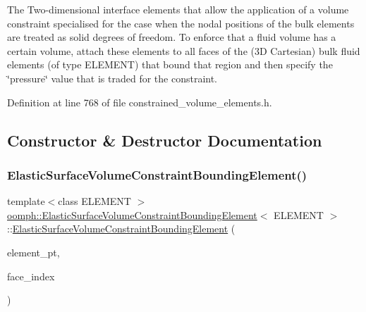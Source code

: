 The Two-\/dimensional interface elements that allow the application of a volume constraint specialised for the case when the nodal positions of the bulk elements are treated as solid degrees of freedom. To enforce that a fluid volume has a certain volume, attach these elements to all faces of the (3D Cartesian) bulk fluid elements (of type E\+L\+E\+M\+E\+NT) that bound that region and then specify the \char`\"{}pressure\char`\"{} value that is traded for the constraint. 

Definition at line 768 of file constrained\+\_\+volume\+\_\+elements.\+h.



\subsection{Constructor \& Destructor Documentation}
\mbox{\label{classoomph_1_1ElasticSurfaceVolumeConstraintBoundingElement_a22e5cb7f3cb0d363301ae8ef232dd6cb}} 
\subsubsection{\texorpdfstring{Elastic\+Surface\+Volume\+Constraint\+Bounding\+Element()}{ElasticSurfaceVolumeConstraintBoundingElement()}}
{\footnotesize\ttfamily template$<$class E\+L\+E\+M\+E\+NT $>$ \\
\hyperlink{classoomph_1_1ElasticSurfaceVolumeConstraintBoundingElement}{oomph\+::\+Elastic\+Surface\+Volume\+Constraint\+Bounding\+Element}$<$ E\+L\+E\+M\+E\+NT $>$\+::\hyperlink{classoomph_1_1ElasticSurfaceVolumeConstraintBoundingElement}{Elastic\+Surface\+Volume\+Constraint\+Bounding\+Element} (\begin{DoxyParamCaption}\item[{\hyperlink{classoomph_1_1FiniteElement}{Finite\+Element} $\ast$const \&}]{element\+\_\+pt,  }\item[{const int \&}]{face\+\_\+index }\end{DoxyParamCaption})\hspace{0.3cm}{\ttfamily [inline]}}



